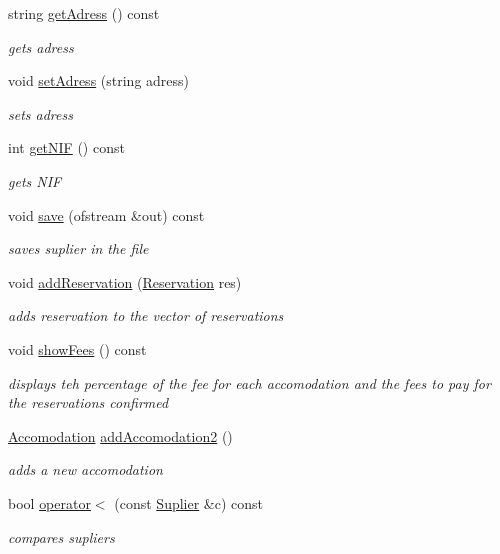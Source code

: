 \begin{DoxyCompactItemize}
$$string \hyperlink{class_suplier_ad6e654f4f26f6268b50f51df117793fb}{get\+Adress} () const
\begin{DoxyCompactList}\small\item\em gets adress \end{DoxyCompactList}\item 
void \hyperlink{class_suplier_a35d4dcc54e96c079ac8792806eeed739}{set\+Adress} (string adress)
\begin{DoxyCompactList}\small\item\em sets adress \end{DoxyCompactList}\item 
int \hyperlink{class_suplier_ae200d0fc598080361dccfc947dd071c5}{get\+N\+IF} () const
\begin{DoxyCompactList}\small\item\em gets N\+IF \end{DoxyCompactList}\item 
void \hyperlink{class_suplier_a91fbf47980aa9c9f3e55d9fcc0320201}{save} (ofstream \&out) const
\begin{DoxyCompactList}\small\item\em saves suplier in the file \end{DoxyCompactList}\item 
void \hyperlink{class_suplier_a2449d37d77317ea100c3d2866f8c8556}{add\+Reservation} (\hyperlink{class_reservation}{Reservation} res)
\begin{DoxyCompactList}\small\item\em adds reservation to the vector of reservations \end{DoxyCompactList}\item 
\hypertarget{class_suplier_ac455dce8b1768090654c0e5a5e840fb1}{}\label{class_suplier_ac455dce8b1768090654c0e5a5e840fb1} 
void \hyperlink{class_suplier_ac455dce8b1768090654c0e5a5e840fb1}{show\+Fees} () const
\begin{DoxyCompactList}\small\item\em displays teh percentage of the fee for each accomodation and the fees to pay for the reservations confirmed \end{DoxyCompactList}\item 
\hyperlink{class_accomodation}{Accomodation} \hyperlink{class_suplier_a0e8af43c647528894ae1876f05fcf842}{add\+Accomodation2} ()
\begin{DoxyCompactList}\small\item\em adds a new accomodation \end{DoxyCompactList}\item 
bool \hyperlink{class_suplier_a2c6b3672a740180fc02670efb6fd8872}{operator$<$} (const \hyperlink{class_suplier}{Suplier} \&c) const
\begin{DoxyCompactList}\small\item\em compares supliers \end{DoxyCompactList}\end{DoxyCompactItemize}
